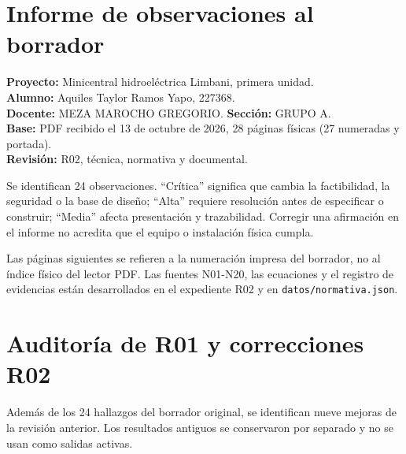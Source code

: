 \documentclass[11pt,letterpaper]{report}
\begin{document}
\chapter*{Informe de observaciones al borrador}
\textbf{Proyecto:} Minicentral hidroeléctrica Limbani, primera unidad.\\
\textbf{Alumno:} Aquiles Taylor Ramos Yapo, 227368.\\
\textbf{Docente:} MEZA MAROCHO GREGORIO. \textbf{Sección:} GRUPO A.\\
\textbf{Base:} PDF recibido el 13 de octubre de 2026, 28 páginas físicas (27 numeradas y portada).\\
\textbf{Revisión:} R02, técnica, normativa y documental.

Se identifican 24 observaciones. ``Crítica'' significa que cambia la factibilidad, la seguridad o la base de diseño; ``Alta'' requiere resolución antes de especificar o construir; ``Media'' afecta presentación y trazabilidad. Corregir una afirmación en el informe no acredita que el equipo o instalación física cumpla.

Las páginas siguientes se refieren a la numeración impresa del borrador, no al índice físico del lector PDF. Las fuentes N01-N20, las ecuaciones y el registro de evidencias están desarrollados en el expediente R02 y en \texttt{datos/normativa.json}.
\setcounter{section}{0}
\renewcommand{\thesection}{\arabic{section}}
\begingroup
\small
\setlength{\parskip}{3pt}
\titlespacing*{\section}{0pt}{.6em}{.2em}

\endgroup
\clearpage
\chapter*{Auditoría de R01 y correcciones R02}
Además de los 24 hallazgos del borrador original, se identifican nueve mejoras de la revisión anterior. Los resultados antiguos se conservaron por separado y no se usan como salidas activas.
\setcounter{section}{0}
\begingroup\small
\setlength{\parskip}{3pt}
\titlespacing*{\section}{0pt}{.6em}{.2em}

\endgroup
\end{document}
